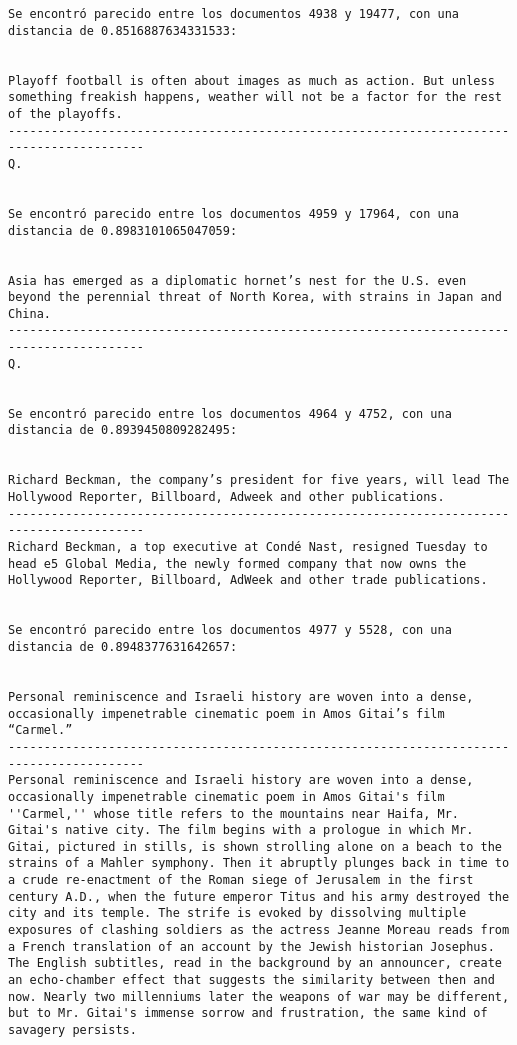 \documentclass[11pt]{article}
\begin{document}
\begin{Verbatim}[commandchars=\\\{\}]
Se encontró parecido entre los documentos 4938 y 19477, con una distancia de 0.8516887634331533:


Playoff football is often about images as much as action. But unless something freakish happens, weather will not be a factor for the rest of the playoffs.
-----------------------------------------------------------------------------------------
Q.


Se encontró parecido entre los documentos 4959 y 17964, con una distancia de 0.8983101065047059:


Asia has emerged as a diplomatic hornet’s nest for the U.S. even beyond the perennial threat of North Korea, with strains in Japan and China.
-----------------------------------------------------------------------------------------
Q.


Se encontró parecido entre los documentos 4964 y 4752, con una distancia de 0.8939450809282495:


Richard Beckman, the company’s president for five years, will lead The Hollywood Reporter, Billboard, Adweek and other publications.
-----------------------------------------------------------------------------------------
Richard Beckman, a top executive at Condé Nast, resigned Tuesday to head e5 Global Media, the newly formed company that now owns the Hollywood Reporter, Billboard, AdWeek and other trade publications.


Se encontró parecido entre los documentos 4977 y 5528, con una distancia de 0.8948377631642657:


Personal reminiscence and Israeli history are woven into a dense, occasionally impenetrable cinematic poem in Amos Gitai’s film “Carmel.”
-----------------------------------------------------------------------------------------
Personal reminiscence and Israeli history are woven into a dense, occasionally impenetrable cinematic poem in Amos Gitai's film ''Carmel,'' whose title refers to the mountains near Haifa, Mr. Gitai's native city. The film begins with a prologue in which Mr. Gitai, pictured in stills, is shown strolling alone on a beach to the strains of a Mahler symphony. Then it abruptly plunges back in time to a crude re-enactment of the Roman siege of Jerusalem in the first century A.D., when the future emperor Titus and his army destroyed the city and its temple. The strife is evoked by dissolving multiple exposures of clashing soldiers as the actress Jeanne Moreau reads from a French translation of an account by the Jewish historian Josephus. The English subtitles, read in the background by an announcer, create an echo-chamber effect that suggests the similarity between then and now. Nearly two millenniums later the weapons of war may be different, but to Mr. Gitai's immense sorrow and frustration, the same kind of savagery persists.



\end{Verbatim}
\end{document}
